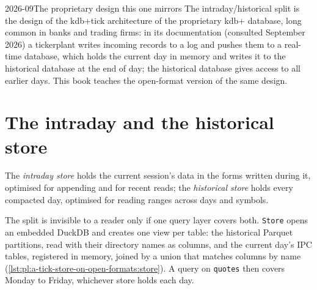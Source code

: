 \begin{dated}{2026-09}{The proprietary design this one mirrors}\label{dat:pl:a-tick-store-on-open-formats:kdb}
The intraday/historical split is the design of the kdb+tick architecture of the proprietary kdb+ database, long common in banks
and trading firms: in its documentation (consulted September 2026) a tickerplant writes incoming records to a log and pushes
them to a real-time database, which holds the current day in memory and writes it to the historical database at the end of
day; the historical database gives access to all earlier days. This book teaches the open-format version of the same design.
\end{dated}

\section{The intraday and the historical store}

\begin{definition}\label{def:pl:a-tick-store-on-open-formats:split}
The \emph{intraday store} holds the current session's data in the forms written during it, optimised for
appending and for recent reads; the \emph{historical store} holds every compacted day, optimised for
reading ranges across days and symbols.
\end{definition}

The split is invisible to a reader only if one query layer covers both. \texttt{Store} opens an embedded DuckDB and creates one
view per table: the historical Parquet partitions, read with their directory names as columns, and the current day's IPC tables,
registered in memory, joined by a union that matches columns by name (\cref{lst:pl:a-tick-store-on-open-formats:store}). A
query on \texttt{quotes} then covers Monday to Friday, whichever store holds each day.

\label{lst:pl:a-tick-store-on-open-formats:store}

